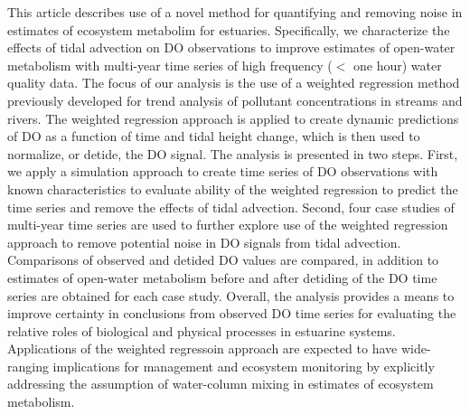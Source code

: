 This article describes use of a novel method for quantifying and removing noise in estimates of ecosystem metabolim for estuaries.  Specifically, we characterize the effects of tidal advection on \ac{DO} observations to improve estimates of open-water metabolism with multi-year time series of high frequency ($<$ one hour) water quality data.  The focus of our analysis is the use of a weighted regression method previously developed for trend analysis of pollutant concentrations in streams and rivers.  The weighted regression approach is applied to create dynamic predictions of \ac{DO} as a function of time and tidal height change, which is then used to normalize, or detide, the \ac{DO} signal.  The analysis is presented in two steps.  First, we apply a simulation approach to create time series of \ac{DO} observations with known characteristics to evaluate ability of the weighted regression to predict the time series and remove the effects of tidal advection.  Second, four case studies of multi-year time series are used to further explore use of the weighted regression approach to remove potential noise in \ac{DO} signals from tidal advection.  Comparisons of observed and detided \ac{DO} values are compared, in addition to estimates of open-water metabolism before and after detiding of the \ac{DO} time series are obtained for each case study.  Overall, the analysis provides a means to improve certainty in conclusions from observed DO time series for evaluating the relative roles of biological and physical processes in estuarine systems.  Applications of the weighted regressoin approach are expected to have wide-ranging implications for management and ecosystem monitoring by explicitly addressing the assumption of water-column mixing in estimates of ecosystem metabolism.
